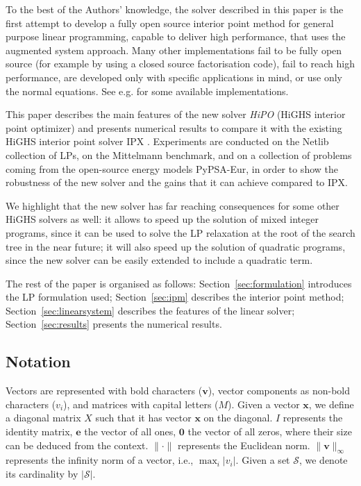 \documentclass[a4paper]{article}
\newcommand{\evec}{\mathbf e}
\newcommand{\vvec}{\mathbf v}
\newcommand{\xvec}{\mathbf x}
\newcommand{\0}{\mathbf 0}
\begin{document}
To the best of the Authors' knowledge, the solver described in this paper is the first attempt to develop a fully open source interior point method for general purpose linear programming, capable to deliver high performance, that uses the augmented system approach. Many other implementations fail to be fully open source (for example by using a closed source factorisation code), fail to reach high performance, are developed only with specific applications in mind, or use only the normal equations. See e.g. \cite{clp,glpk} for some available implementations.

This paper describes the main features of the new solver {\it HiPO} (HiGHS interior point optimizer) and presents numerical results to compare it with the existing HiGHS interior point solver IPX \cite{SchGon:basisIPM}. Experiments are conducted on the Netlib collection of LPs, on the Mittelmann benchmark, and on a collection of problems coming from the open-source energy models PyPSA-Eur, in order to show the robustness of the new solver and the gains that it can achieve compared to IPX.

We highlight that the new solver has far reaching consequences for some other HiGHS solvers as well: it allows to speed up the solution of mixed integer programs, since it can be used to solve the LP relaxation at the root of the search tree in the near future; it will also speed up the solution of quadratic programs, since the new solver can be easily extended to include a quadratic term.

The rest of the paper is organised as follows: Section~\ref{sec:formulation} introduces the LP formulation used; Section~\ref{sec:ipm} describes the interior point method; Section~\ref{sec:linearsystem} describes the features of the linear solver; Section~\ref{sec:results} presents the numerical results.

\subsection{Notation}
Vectors are represented with bold characters ($\vvec$), vector components as non-bold characters ($v_i$), and matrices with capital letters ($M$). Given a vector $\xvec$, we define a diagonal matrix $X$ such that it has vector $\xvec$ on the diagonal. $I$ represents the identity matrix, $\evec$ the vector of all ones, $\0$ the vector of all zeros, where their size can be deduced from the context. $\|\cdot\|$ represents the Euclidean norm. $\|\vvec\|_\infty$ represents the infinity norm of a vector, i.e., $\max_i |v_i|$.
Given a set $\mathcal S$, we denote its cardinality by $|\mathcal S|$.
\end{document}
